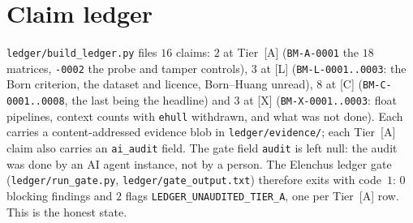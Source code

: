 \documentclass[10pt]{article}
\newcommand{\tier}[1]{\textsf{[#1]}}
\newcommand{\tA}{\tier{A}}
\newcommand{\tL}{\tier{L}}
\newcommand{\tC}{\tier{C}}
\newcommand{\tX}{\tier{X}}
\begin{document}
\section{Claim ledger}\label{sec:ledger}
\texttt{ledger/build\_ledger.py} files $16$ claims: $2$ at Tier~\tA{} (\texttt{BM-A-0001} the $18$ matrices, \texttt{-0002} the probe and tamper controls), $3$ at \tL{} (\texttt{BM-L-0001..0003}: the Born criterion, the dataset and licence, Born--Huang unread), $8$ at \tC{} (\texttt{BM-C-0001..0008}, the last being the headline) and $3$ at \tX{} (\texttt{BM-X-0001..0003}: float pipelines, context counts with \texttt{ehull} withdrawn, and what was not done). Each carries a content-addressed evidence blob in \texttt{ledger/evidence/}; each Tier~\tA{} claim also carries an \texttt{ai\_audit} field. The gate field \texttt{audit} is left null: the audit was done by an AI agent instance, not by a person. The Elenchus ledger gate (\texttt{ledger/run\_gate.py}, \texttt{ledger/gate\_output.txt}) therefore exits with code~$1$: $0$ blocking findings and $2$ flags \texttt{LEDGER\_UNAUDITED\_TIER\_A}, one per Tier~\tA{} row. This is the honest state.

\end{document}
